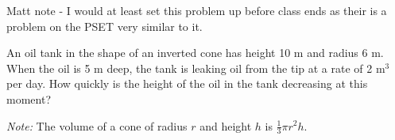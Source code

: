 \documentclass[main]{subfiles}
\begin{document}
\begin{enumerate}[resume]
{      Matt note - I would at least set this problem up before class ends as their is a problem on the PSET very similar to it.
    }

    \begin{problem}[\vfill]
      An oil tank in the shape of an inverted cone has height 10 m and
      radius 6 m. When the oil is 5 m deep, the tank is leaking oil from
      the tip at a rate of 2 m$^3$ per day. How quickly is the height of
      the oil in the tank decreasing at this moment?

      \textit{Note:} The volume of a cone of radius $r$ and height $h$ is
      $\frac{1}{3} \pi r^2 h$.
    \end{problem}

    \begin{solution}


\end{solution}
\end{enumerate}
\end{document}
